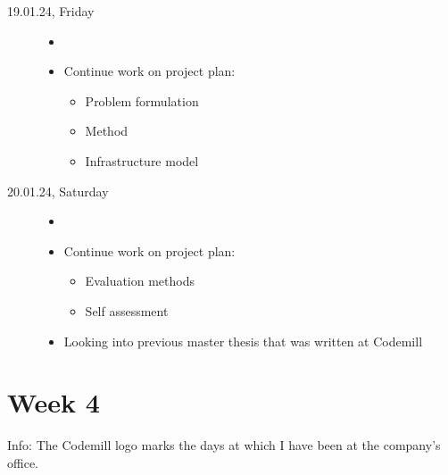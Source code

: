 \documentclass[a4, 11pt]{scrartcl}
\begin{document}
\begin{description}
\item[19.01.24, Friday]

\begin{itemize}
	\item[]
				\item Continue work on project plan:
	\begin{itemize}
		\item Problem formulation
		\item Method
		\item Infrastructure model
	\end{itemize}
\end{itemize}







\item[20.01.24, Saturday]

\begin{itemize}
	\item[]
	\item Continue work on project plan:
	\begin{itemize}
		\item Evaluation methods
		\item Self assessment
	\end{itemize}
	\item Looking into previous master thesis that was written at Codemill
\end{itemize}

	\end{description}








\newpage
\section*{Week 4}

Info: The Codemill logo marks the days at which I have been at the company's office.
\end{document}
